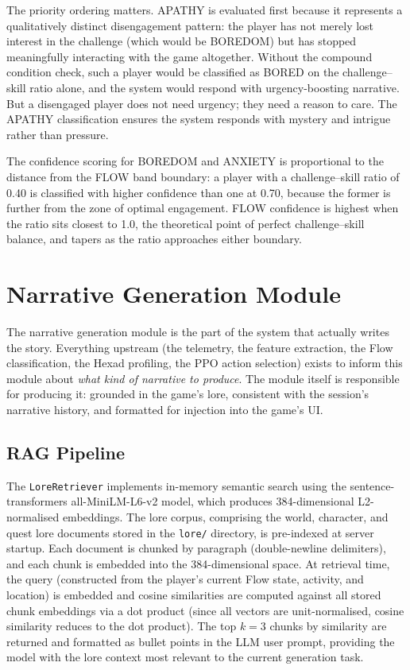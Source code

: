 The priority ordering matters. APATHY is evaluated first because it represents a qualitatively distinct disengagement pattern: the player has not merely lost interest in the challenge (which would be BOREDOM) but has stopped meaningfully interacting with the game altogether. Without the compound condition check, such a player would be classified as BORED on the challenge--skill ratio alone, and the system would respond with urgency-boosting narrative. But a disengaged player does not need urgency; they need a reason to care. The APATHY classification ensures the system responds with mystery and intrigue rather than pressure.

The confidence scoring for BOREDOM and ANXIETY is proportional to the distance from the FLOW band boundary: a player with a challenge--skill ratio of 0.40 is classified with higher confidence than one at 0.70, because the former is further from the zone of optimal engagement. FLOW confidence is highest when the ratio sits closest to 1.0, the theoretical point of perfect challenge--skill balance, and tapers as the ratio approaches either boundary.

\section{Narrative Generation Module}

The narrative generation module is the part of the system that actually writes the story. Everything upstream (the telemetry, the feature extraction, the Flow classification, the Hexad profiling, the PPO action selection) exists to inform this module about \textit{what kind of narrative to produce}. The module itself is responsible for producing it: grounded in the game's lore, consistent with the session's narrative history, and formatted for injection into the game's UI.

\subsection{RAG Pipeline}

The \texttt{LoreRetriever} implements in-memory semantic search using the sentence-transformers all-MiniLM-L6-v2 model, which produces 384-dimensional L2-normalised embeddings. The lore corpus, comprising the world, character, and quest lore documents stored in the \texttt{lore/} directory, is pre-indexed at server startup. Each document is chunked by paragraph (double-newline delimiters), and each chunk is embedded into the 384-dimensional space. At retrieval time, the query (constructed from the player's current Flow state, activity, and location) is embedded and cosine similarities are computed against all stored chunk embeddings via a dot product (since all vectors are unit-normalised, cosine similarity reduces to the dot product). The top $k = 3$ chunks by similarity are returned and formatted as bullet points in the LLM user prompt, providing the model with the lore context most relevant to the current generation task.

